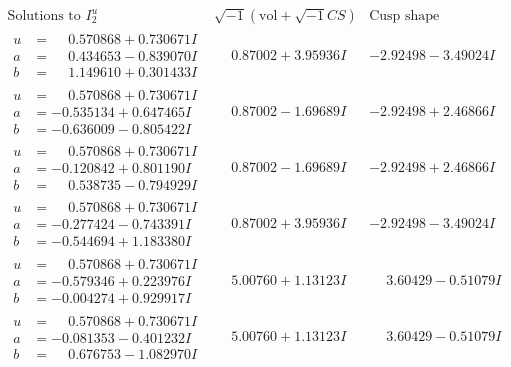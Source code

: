\documentclass[1p]{elsarticle_modified}
\theoremstyle{definition}
\newcommand{\I}{\sqrt{-1}}
\begin{document}
$$\begin{array}{c|c|c}  
\text{Solutions to }I^u_{2}& \I (\text{vol} + \sqrt{-1}CS) & \text{Cusp shape}\\
 \hline 
\begin{aligned}
u &= \phantom{-}0.570868 + 0.730671 I \\
a &= \phantom{-}0.434653 - 0.839070 I \\
b &= \phantom{-}1.149610 + 0.301433 I\end{aligned}
 & \phantom{-}0.87002 + 3.95936 I & -2.92498 - 3.49024 I \\ \hline\begin{aligned}
u &= \phantom{-}0.570868 + 0.730671 I \\
a &= -0.535134 + 0.647465 I \\
b &= -0.636009 - 0.805422 I\end{aligned}
 & \phantom{-}0.87002 - 1.69689 I & -2.92498 + 2.46866 I \\ \hline\begin{aligned}
u &= \phantom{-}0.570868 + 0.730671 I \\
a &= -0.120842 + 0.801190 I \\
b &= \phantom{-}0.538735 - 0.794929 I\end{aligned}
 & \phantom{-}0.87002 - 1.69689 I & -2.92498 + 2.46866 I \\ \hline\begin{aligned}
u &= \phantom{-}0.570868 + 0.730671 I \\
a &= -0.277424 - 0.743391 I \\
b &= -0.544694 + 1.183380 I\end{aligned}
 & \phantom{-}0.87002 + 3.95936 I & -2.92498 - 3.49024 I \\ \hline\begin{aligned}
u &= \phantom{-}0.570868 + 0.730671 I \\
a &= -0.579346 + 0.223976 I \\
b &= -0.004274 + 0.929917 I\end{aligned}
 & \phantom{-}5.00760 + 1.13123 I & \phantom{-}3.60429 - 0.51079 I \\ \hline\begin{aligned}
u &= \phantom{-}0.570868 + 0.730671 I \\
a &= -0.081353 - 0.401232 I \\
b &= \phantom{-}0.676753 - 1.082970 I\end{aligned}
 & \phantom{-}5.00760 + 1.13123 I & \phantom{-}3.60429 - 0.51079 I \\ \hline\begin{aligned}

\end{aligned}
\end{array}$$
\end{document}
